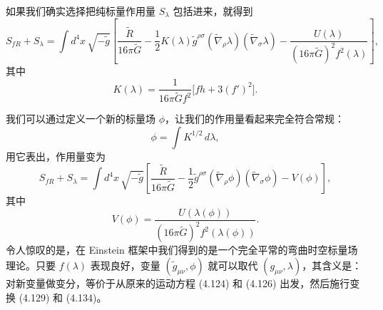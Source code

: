 如果我们确实选择把纯标量作用量 $S_\lambda$ 包括进来，就得到
\begin{equation*}
S_{fR} + S_\lambda = \int d^4x\,\sqrt{-\widetilde{g}}\left[\frac{\widetilde{R}}{16\pi\widetilde{G}} - \frac{1}{2}K(\lambda)\widetilde{g}^{\rho\sigma}(\widetilde{\nabla}_\rho\lambda)(\widetilde{\nabla}_\sigma\lambda) - \frac{U(\lambda)}{(16\pi\widetilde{G})^2 f^2(\lambda)}\right],
\tag{4.132}
\end{equation*}
其中
\begin{equation*}
K(\lambda) = \frac{1}{16\pi\widetilde{G}f^2}\big[fh + 3(f')^2\big].
\tag{4.133}
\end{equation*}

我们可以通过定义一个新的标量场 $\phi$，让我们的作用量看起来完全符合常规：
\begin{equation*}
\phi = \int K^{1/2}\,d\lambda,
\tag{4.134}
\end{equation*}
用它表出，作用量变为
\begin{equation*}
S_{fR} + S_\lambda = \int d^4x\,\sqrt{-\widetilde{g}}\left[\frac{\widetilde{R}}{16\pi\widetilde{G}} - \frac{1}{2}\widetilde{g}^{\rho\sigma}(\widetilde{\nabla}_\rho\phi)(\widetilde{\nabla}_\sigma\phi) - V(\phi)\right],
\tag{4.135}
\end{equation*}
其中
\begin{equation*}
V(\phi) = \frac{U(\lambda(\phi))}{(16\pi\widetilde{G})^2 f^2(\lambda(\phi))}.
\tag{4.136}
\end{equation*}
令人惊叹的是，在 Einstein 框架中我们得到的是一个完全平常的弯曲时空标量场理论。只要 $f(\lambda)$ 表现良好，变量 $(\widetilde{g}_{\mu\nu}, \phi)$ 就可以取代 $(g_{\mu\nu}, \lambda)$，其含义是：对新变量做变分，等价于从原来的运动方程 (4.124) 和 (4.126) 出发，然后施行变换 (4.129) 和 (4.134)。

